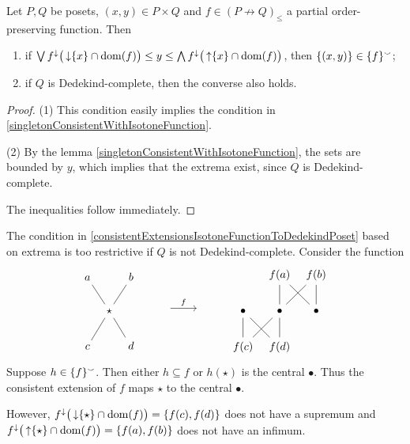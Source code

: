 \begin{corollary} \label{consistentExtensionsIsotoneFunctionToDedekindPoset}
Let $P, Q$ be posets, $(x,y)\in P\times Q$ and $f\in (P\not\to Q)_\leq$ a partial order-preserving function. Then
\begin{enumerate}
\item if $\bigvee f^\downarrow\big(\operatorname{\downarrow} \{x\} \cap \operatorname{dom}(f)\big) \leq y \leq \bigwedge f^\downarrow\big(\operatorname{\uparrow} \{x\} \cap \operatorname{dom}(f)\big)$, then $\{(x,y)\} \in \{f\}^\smallsmile$;
\item if $Q$ is Dedekind-complete, then the converse also holds.
\end{enumerate}
\end{corollary}
\begin{proof}
(1) This condition easily implies the condition in \ref{singletonConsistentWithIsotoneFunction}.

(2) By the lemma \ref{singletonConsistentWithIsotoneFunction}, the sets are bounded by $y$, which implies that the extrema exist, since $Q$ is Dedekind-complete.

The inequalities follow immediately.
\end{proof}

\begin{example}
The condition in \ref{consistentExtensionsIsotoneFunctionToDedekindPoset} based on extrema is too restrictive if $Q$ is not Dedekind-complete. Consider the function
\[ \begin{tikzcd}[column sep=tiny]
a \ar[dr, dash] & {} & b \ar[dl, dash] \\
{} & \star & {} \\
c \ar[ur, dash] & {} & d \ar[ul, dash]
\end{tikzcd} \qquad \begin{tikzcd}
{} \ar[r, "f"] & {}
\end{tikzcd} \qquad \begin{tikzcd}[column sep=tiny]
{} & f(a) \ar[d, dash] \ar[dr, dash] & f(b) \ar[dl, dash] \ar[d, dash] \\
\bullet \ar[d, dash] \ar[dr, dash] & \bullet \ar[dl, dash] \ar[d, dash] & \bullet \\
f(c) & f(d) & {}
\end{tikzcd} \]
Suppose $h \in \{f\}^\smallsmile$. Then either $h\subseteq f$ or $h(\star)$ is the central $\bullet$. Thus the consistent extension of $f$ maps $\star$ to the central $\bullet$.

However, $f^\downarrow\big(\operatorname{\downarrow}\{\star\} \cap \operatorname{dom}(f)\big) = \{f(c), f(d)\}$ does not have a supremum and $f^\downarrow\big(\operatorname{\uparrow}\{\star\} \cap \operatorname{dom}(f)\big) = \{f(a), f(b)\}$ does not have an infimum.
\end{example}

